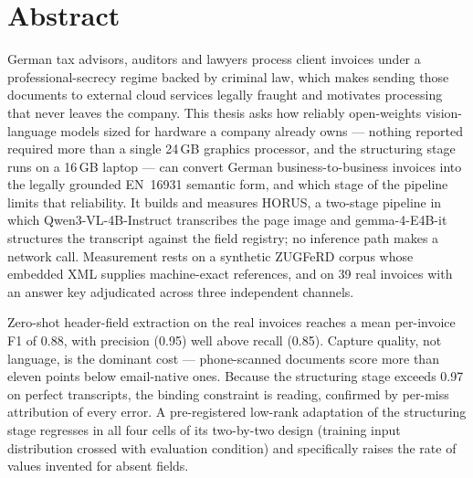 \chapter*{Abstract}


German tax advisors, auditors and lawyers process client invoices under a
professional-secrecy regime backed by criminal law, which makes sending those
documents to external cloud services legally fraught and motivates processing
that never leaves the company. This thesis asks how reliably open-weights
vision-language models sized for hardware a company already owns --- nothing
reported required more than a single 24\,GB graphics processor, and the
structuring stage runs on a 16\,GB laptop --- can convert German
business-to-business invoices into the legally
grounded \acs{EN}~16931 semantic form, and which stage of the pipeline limits
that reliability. It builds and measures HORUS, a two-stage pipeline in which
Qwen3-VL-4B-Instruct transcribes the page image and gemma-4-E4B-it structures
the transcript against the field registry; no inference path makes a network
call. Measurement
rests on a synthetic \acf{ZUGFeRD} corpus whose embedded \acs{XML} supplies
machine-exact references, and on 39 real invoices with an answer key adjudicated
across three independent channels.

Zero-shot header-field extraction on the real invoices reaches a mean
per-invoice \acs{F1} of 0.88, with precision (0.95) well above recall (0.85).
Capture quality, not language, is the dominant cost --- phone-scanned documents
score more than eleven points below email-native ones. Because the structuring
stage exceeds 0.97 on perfect transcripts, the binding constraint is reading,
confirmed by per-miss attribution of every error. A pre-registered low-rank
adaptation of the structuring stage regresses in all four cells of its
two-by-two design (training input distribution crossed with evaluation
condition) and specifically raises the rate of values invented for absent
fields.

